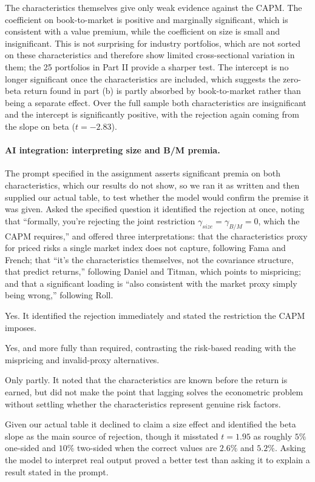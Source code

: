 The characteristics themselves give only weak evidence against the CAPM. The
coefficient on book-to-market is positive and marginally significant, which is
consistent with a value premium, while the coefficient on size is small and
insignificant. This is not surprising for industry portfolios, which are not
sorted on these characteristics and therefore show limited cross-sectional
variation in them; the 25 portfolios in Part II provide a sharper test. The
intercept is no longer significant once the characteristics are included, which
suggests the zero-beta return found in part (b) is partly absorbed by
book-to-market rather than being a separate effect. Over the full sample both
characteristics are insignificant and the intercept is significantly positive,
with the rejection again coming from the slope on beta ($t = -2.83$).

\paragraph{AI integration: interpreting size and B/M premia.} The prompt
specified in the assignment asserts significant premia on both characteristics,
which our results do not show, so we ran it as written and then supplied our
actual table, to test whether the model would confirm the premise it was given.
Asked the specified question it identified the rejection at once, noting that
``formally, you're rejecting the joint restriction
$\gamma_{size} = \gamma_{B/M} = 0$, which the CAPM requires,'' and offered
three interpretations: that the characteristics proxy for priced risks a single
market index does not capture, following Fama and French; that ``it's the
characteristics themselves, not the covariance structure, that predict
returns,'' following Daniel and Titman, which points to mispricing; and that a
significant loading is ``also consistent with the market proxy simply being
wrong,'' following Roll.

\begin{tight}
\item[(i)] Yes. It identified the rejection immediately and stated the
restriction the CAPM imposes.
\item[(ii)] Yes, and more fully than required, contrasting the risk-based
reading with the mispricing and invalid-proxy alternatives.
\item[(iii)] Only partly. It noted that the characteristics are known before
the return is earned, but did not make the point that lagging solves the
econometric problem without settling whether the characteristics represent
genuine risk factors.
\end{tight}

Given our actual table it declined to claim a size effect and identified the
beta slope as the main source of rejection, though it misstated $t = 1.95$ as
roughly $5\%$ one-sided and $10\%$ two-sided when the correct values are
$2.6\%$ and $5.2\%$. Asking the model to interpret real output proved a better
test than asking it to explain a result stated in the prompt.
